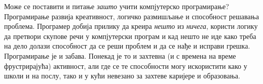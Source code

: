 		Може се поставити и питање \emph{зашто} учити компјутерско програмирање? Програмирање развија креативност, логичко размишљање и способност решавања проблема. Програмер добија прилику да креира \emph{нешто} из \emph{ничега}, користи логику да претвори скупове речи у компјутерски програм и кад нешто не иде како треба на дело долази способност да се реши проблем и да се нађе и исправи грешка. \\
		Програмирање је и забава. Понекад је то и захтевна (и с времена на време фрустрирајућа) активност, али где се те способности могу искористити како у школи и на послу, тако и у кући невезано за захтеве каријере и образовања.\\